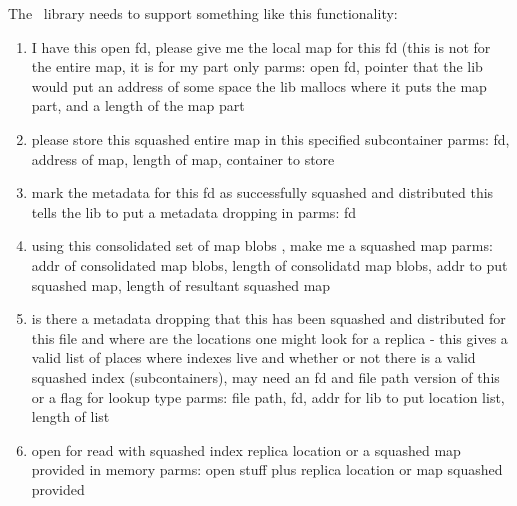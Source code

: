 The \plfs\ library needs to support something like this functionality:

\begin{enumerate}
\item{ I have this open fd, please give me the local map for
this fd (this is not for the entire map, it is for my part
only
parms: open fd, pointer that the lib would put an address of some
space the lib mallocs where it puts the map part, and a length of
the map part}
\item{ please store this squashed entire map in this
specified subcontainer
parms: fd, address of map, length of map, container to store}
\item{ mark the metadata for this fd as successfully squashed and distributed
this tells the lib to put a metadata dropping in
parms: fd}

\item{ using this consolidated set of map blobs , make me a squashed map
parms: addr of consolidated map blobs, length of consolidatd map blobs,
addr to put squashed map, length of resultant squashed map}

\item{ is there a metadata dropping that this has been squashed and
distributed for this file and where are the locations one might
look for a replica - this gives a valid list of places where
indexes live and whether or not there is a valid squashed index
(subcontainers),
may need an fd and file path version of this or a flag for lookup type
parms: file path, fd, addr for lib to put location list, length of list}

\item{ open for read with squashed index replica location or a squashed map
provided in memory
parms: open stuff plus replica location or map squashed provided}
\end{enumerate}

